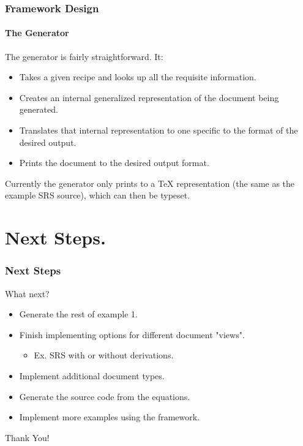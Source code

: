 \documentclass{beamer}
\begin{document}
\begin{frame}

\frametitle{Framework Design}

\framesubtitle{The Generator}

The generator is fairly straightforward. It:
\begin{itemize}
	\item Takes a given recipe and looks up all the requisite information.
	\item Creates an internal generalized representation of the document being 
			generated.
	\item Translates that internal representation to one specific to the
			format of the desired output.
	\item Prints the document to the desired output format.
\end{itemize}

Currently the generator only prints to a TeX representation (the same as the
example SRS source), which can then be typeset.
\end{frame}


\section[Next Steps]{Next Steps.}


\begin{frame}

\frametitle{Next Steps}


\begin{Large}
What next?
\end{Large}

\begin{itemize}
\item Generate the rest of example 1.
\item Finish implementing options for different document "views".
\begin{itemize}
\item Ex. SRS with or without derivations.
\end{itemize}
\item Implement additional document types.
\item Generate the source code from the equations.
\item Implement more examples using the framework.
\end{itemize}
\end{frame}


\begin{frame}
\begin{center}
\Huge Thank You!
\end{center}
\end{frame}

\end{document}
